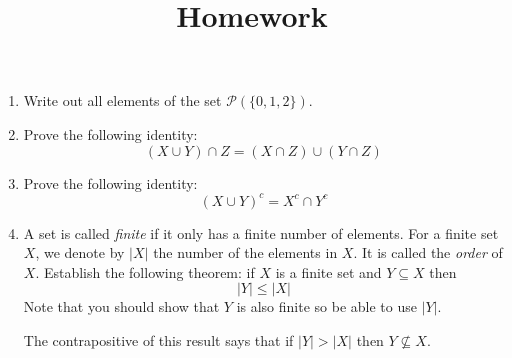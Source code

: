 \documentclass[12pt]{amsart}
\theoremstyle{definition}
\begin{document}
\title{Homework}

\maketitle

\begin{enumerate}
	\item Write out all elements of the set $\mathcal P(\{0,1,2\})$. 
		
	\item Prove the following identity: 
	\begin{displaymath}
		(X \cup Y) \cap Z = (X \cap Z) \cup (Y \cap Z)
	\end{displaymath}

	\item Prove the following identity:
	\begin{displaymath}
		(X \cup Y)^c = X^c \cap Y^c
	\end{displaymath}

	\item A set is called \textit{finite} if it only has a finite number of elements. 
		For a finite set $X$, we denote by $|X|$ the number of the elements 
		in $X$. It is called the \textit{order} of $X$. Establish the following 
		theorem: if $X$ is a finite set and $Y \subseteq X$ then 
		\begin{displaymath}
			|Y| \leq |X| 
		\end{displaymath}
		Note that you should show that $Y$ is also finite so be able to 
		use $|Y|$. 

		The contrapositive of this result says that if $|Y| > |X|$ then $Y \nsubseteq X$. 


\end{enumerate}
\end{document}
